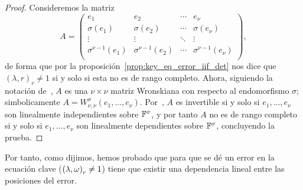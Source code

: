 \begin{proof}
Consideremos la matriz
\[
A =
\begin{pmatrix}
e_1 & e_2 & \cdots & e_{\nu} \\
\sigma(e_1) & \sigma(e_2) & \cdots & \sigma(e_{\nu}) \\
\vdots &\vdots &\ddots &\vdots \\
\sigma^{\nu-1}(e_1) & \sigma^{\nu-1}(e_2) & \cdots & \sigma^{\nu-1}(e_{\nu}) \\
\end{pmatrix}
,\]
de forma que por la proposición~\ref{prop:key_eq_error_iif_det} nos dice que \({(\lambda, r)}_r \neq 1\) si y solo si esta no es de rango completo. Ahora, siguiendo la notación de~\cite{lam_vandermonde_1988}, \(A\) es una \(\nu \times \nu\) matriz Wronskiana con respecto al endomorfismo \(\sigma\); simbolicamente \(A = W_{\nu,\nu}^{\sigma}(e_1, \ldots, e_\nu)\). Por~\cite[Corolario 4.13]{lam_vandermonde_1988}, \(A\) es invertible si y solo si \(e_1, \ldots, e_\nu\) son linealmente independientes sobre \(\mathbb{F}^{\sigma}\), y por tanto \(A\) no es de rango completo si y solo si \(e_1, \ldots, e_\nu\) son linealmente dependientes sobre \(\mathbb{F}^{\sigma}\), concluyendo la prueba.
\end{proof}

Por tanto, como dijimos, hemos probado que para que se dé un error en la ecuación clave (\({(\lambda, \omega)}_r \neq 1\)) tiene que existir una dependencia lineal entre las posiciones del error.
